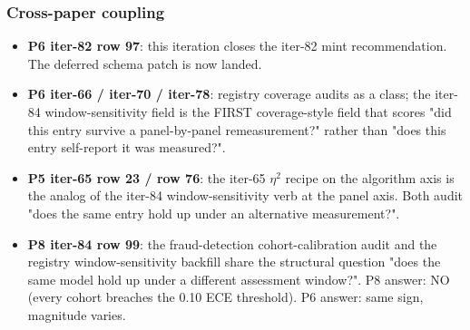 \subsubsection{Cross-paper coupling}
\begin{itemize}
\item \textbf{P6 iter-82 row 97}: this iteration closes the iter-82 mint
      recommendation. The deferred schema patch is now landed.
\item \textbf{P6 iter-66 / iter-70 / iter-78}: registry coverage audits
      as a class; the iter-84 window-sensitivity field is the FIRST
      coverage-style field that scores "did this entry survive a
      panel-by-panel remeasurement?" rather than "does this entry
      self-report it was measured?".
\item \textbf{P5 iter-65 row 23 / row 76}: the iter-65 $\eta^2$ recipe on
      the algorithm axis is the analog of the iter-84 window-sensitivity
      verb at the panel axis. Both audit "does the same entry hold up
      under an alternative measurement?".
\item \textbf{P8 iter-84 row 99}: the fraud-detection cohort-calibration
      audit and the registry window-sensitivity backfill share the
      structural question "does the same model hold up under a different
      assessment window?". P8 answer: NO (every cohort breaches the
      0.10 ECE threshold). P6 answer: same sign, magnitude varies.
\end{itemize}
